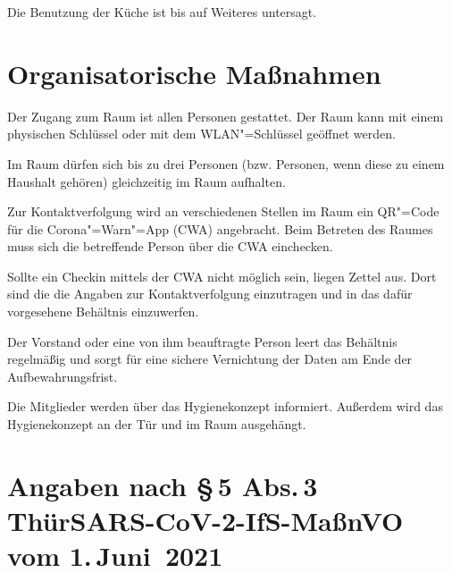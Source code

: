 \documentclass[a4paper,12pt,parskip=half]{scrartcl}
\begin{document}
Die Benutzung der Küche ist bis auf Weiteres untersagt.

\section*{Organisatorische Maßnahmen}

Der Zugang zum Raum ist allen Personen gestattet. Der Raum kann mit einem
physischen Schlüssel oder mit dem WLAN"=Schlüssel geöffnet werden. 

Im Raum dürfen sich bis zu drei Personen (bzw. Personen, wenn diese zu einem
Haushalt gehören) gleichzeitig im Raum aufhalten.

Zur Kontaktverfolgung wird an verschiedenen Stellen im Raum ein QR"=Code für die
Corona"=Warn"=App (CWA) angebracht. Beim Betreten des Raumes muss sich die betreffende
Person über die CWA einchecken.

Sollte ein Checkin mittels der CWA nicht möglich sein, liegen Zettel aus. Dort
sind die die Angaben zur Kontaktverfolgung einzutragen und in das dafür
vorgesehene Behältnis einzuwerfen.

Der Vorstand oder eine von ihm beauftragte Person leert das Behältnis regelmäßig
und sorgt für eine sichere Vernichtung der Daten am Ende der Aufbewahrungsfrist.

Die Mitglieder werden über das Hygienekonzept informiert. Außerdem wird das Hygienekonzept an der Tür und im Raum ausgehängt.

\section*{Angaben nach §\,5 Abs.\,3 ThürSARS-CoV-2-IfS-MaßnVO vom
  1.\,Juni~2021}
\end{document}
